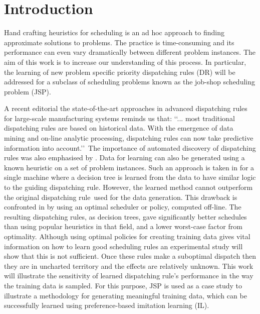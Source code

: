 \documentclass[twocolumn]{svjour3}
\newcommand{\dr}{dispatching rule}
\begin{document}

\section{Introduction}\label{sec:introduction}

Hand crafting heuristics for scheduling is an ad hoc approach to finding 
approximate solutions to problems. The practice is time-consuming and its 
performance can even vary dramatically between different problem instances. The 
aim of this work is to increase our understanding of this process. In 
particular, the learning of new problem specific priority \dr s (DR) will be 
addressed for a subclass of scheduling problems known as the job-shop 
scheduling 
problem (JSP). 

A recent editorial the state-of-the-art approaches \cite{Chen13} in advanced 
\dr s for large-scale manufacturing systems reminds us that:
\lq\lq ... most traditional \dr s are based on historical data. 
With the emergence of data mining and on-line analytic processing, dispatching 
rules can now take predictive information into account.\rq\rq~The importance of 
automated discovery of \dr s was also emphasised by \cite{Monch13}. 
Data for learning can also be generated using a known heuristic on a set of 
problem instances.
Such an approach is taken in \cite{Siggi05} for a single machine where
a decision tree is learned from the data to have similar logic to the guiding 
\dr. 
However, the learned method cannot outperform the original \dr\ used for the 
data generation. 
This drawback is confronted in \cite{Malik08,Russell09,Siggi10} by using an 
optimal scheduler or policy, computed off-line. The 
resulting \dr s, as decision trees, gave significantly better schedules than 
using popular heuristics in that field, and a lower worst-case factor from 
optimality. 
Although using optimal policies for creating training data gives vital 
information on how to learn good scheduling rules an experimental study will 
show that this is not sufficient. 
Once these rules make a suboptimal dispatch then they are in uncharted 
territory and the effects are relatively unknown. 
This work will illustrate the sensitivity of learned \dr's performance in the 
way the training data is sampled.
For this purpose, JSP is used as a case study to illustrate a methodology for 
generating meaningful training data, which can be successfully 
learned using preference-based imitation learning (IL).
\end{document}
